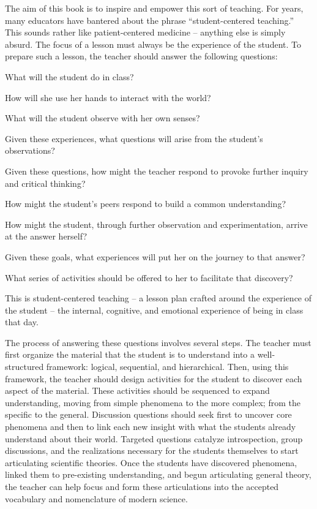 The aim of this book is to inspire and empower this sort of teaching. For years, many educators have bantered about the phrase ``student-centered teaching.'' This sounds rather like patient-centered medicine -- anything else is simply absurd. The focus of a lesson must always be the experience of the student. To prepare such a lesson, the teacher should answer the following questions:
\begin{itemize*}
\item What will the student do in class? 
\item How will she use her hands to interact with the world? 
\item What will the student observe with her own senses? 
\item Given these experiences, what questions will arise from the student's observations? 
\item Given these questions, how might the teacher respond to provoke further inquiry and critical thinking? 
\item How might the student's peers respond to build a common understanding? 
\item How might the student, through further observation and experimentation, arrive at the answer herself? 
\item Given these goals, what experiences will put her on the journey to that answer? 
\item What series of activities should be offered to her to facilitate that discovery? 
\end{itemize*}

This is student-centered teaching -- a lesson plan crafted around the experience of the student -- the internal, cognitive, and emotional experience of being in class that day.

The process of answering these questions involves several steps. The teacher must first organize the material that the student is to understand into a well-structured framework: logical, sequential, and hierarchical. Then, using this framework, the teacher should design activities for the student to discover each aspect of the material. These activities should be sequenced to expand understanding, moving from simple phenomena to the more complex; from the specific to the general. Discussion questions should seek first to uncover core phenomena and then to link each new insight with what the students already understand about their world. Targeted questions catalyze introspection, group discussions, and the realizations necessary for the students themselves to start articulating scientific theories. Once the students have discovered phenomena, linked them to pre-existing understanding, and begun articulating general theory, the teacher can help focus and form these articulations into the accepted vocabulary and nomenclature of modern science.

